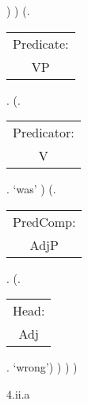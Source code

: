\documentclass[12pt,letterpaper]{article}
\begin{document}
\begin{figure}
\begin{center}
\begin{parsetree}
				)
				)
				(.\begin{tabular}{c}Predicate:\\VP\end{tabular}.
				(.\begin{tabular}{c}Predicator:\\V\end{tabular}. `was' )
				(.\begin{tabular}{c}PredComp:\\AdjP\end{tabular}. 
				(.\begin{tabular}{c}Head:\\Adj\end{tabular}. `wrong')
				)
				)
				)
				
				\hfill \break\hfill \break
			\end{parsetree}
			4.ii.a
		\end{center}
	\end{figure}
	
\end{document}
